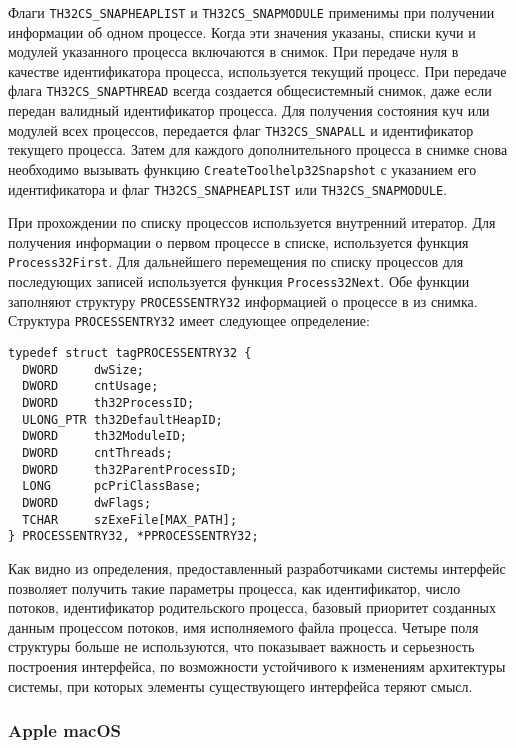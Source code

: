 Флаги \texttt{TH32CS\_SNAPHEAPLIST} и \texttt{TH32CS\_SNAPMODULE} применимы при
получении информации об одном процессе. Когда эти значения указаны, списки кучи
и модулей указанного процесса включаются в снимок. При передаче нуля в качестве
идентификатора процесса, используется текущий процесс. При передаче флага
\texttt{TH32CS\_SNAPTHREAD} всегда создается общесистемный снимок, даже если
передан валидный идентификатор процесса.
Для получения состояния куч или модулей всех процессов, передается флаг
\texttt{TH32CS\_SNAPALL} и идентификатор текущего процесса. Затем для каждого
дополнительного процесса в снимке снова необходимо вызывать функцию
\texttt{CreateToolhelp32Snapshot} с указанием его идентификатора и флаг
\texttt{TH32CS\_SNAPHEAPLIST} или \texttt{TH32CS\_SNAPMODULE}.

При прохождении по списку процессов используется внутренний итератор. Для
получения информации о первом процессе в списке, используется функция
\texttt{Process32First}. Для дальнейшего перемещения по списку процессов для
последующих записей используется функция \texttt{Process32Next}. Обе функции
заполняют структуру \texttt{PROCESSENTRY32} информацией о процессе в из снимка.
Структура \texttt{PROCESSENTRY32} имеет следующее определение:

\medskip
\begin{lstlisting}[style=cstyle]
typedef struct tagPROCESSENTRY32 {
  DWORD     dwSize;
  DWORD     cntUsage;
  DWORD     th32ProcessID;
  ULONG_PTR th32DefaultHeapID;
  DWORD     th32ModuleID;
  DWORD     cntThreads;
  DWORD     th32ParentProcessID;
  LONG      pcPriClassBase;
  DWORD     dwFlags;
  TCHAR     szExeFile[MAX_PATH];
} PROCESSENTRY32, *PPROCESSENTRY32;
\end{lstlisting}
\medskip

Как видно из определения, предоставленный разработчиками системы интерфейс
позволяет получить такие параметры процесса, как идентификатор, число потоков,
идентификатор родительского процесса, базовый приоритет созданных данным
процессом потоков, имя исполняемого файла процесса. Четыре поля структуры
больше не используются, что показывает важность и серьезность построения
интерфейса, по возможности устойчивого к изменениям архитектуры системы, при
которых элементы существующего интерфейса теряют смысл.

\subsubsection{Apple macOS}
\label{sub:domain:analogs:macos}

